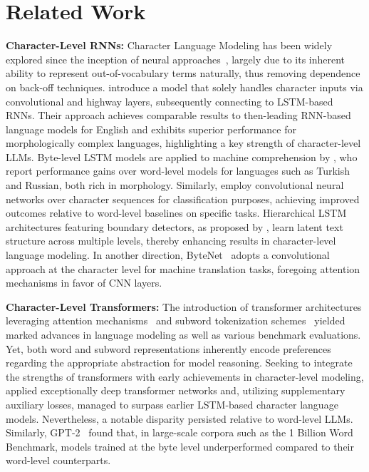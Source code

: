 \section{Related Work}
\label{section:related_work}

\textbf{Character-Level RNNs:} Character Language Modeling has been widely explored since the inception of neural approaches~\citep{sutskever2011generating,mikolov2012subword,graves2013generating}, largely due to its inherent ability to represent out-of-vocabulary terms naturally, thus removing dependence on back-off techniques. \cite{kim2016character} introduce a model that solely handles character inputs via convolutional and highway layers, subsequently connecting to LSTM-based RNNs. Their approach achieves comparable results to then-leading RNN-based language models for English and exhibits superior performance for morphologically complex languages, highlighting a key strength of character-level LLMs. Byte-level LSTM models are applied to machine comprehension by \cite{kenter2018byte}, who report performance gains over word-level models for languages such as Turkish and Russian, both rich in morphology. Similarly, \cite{zhang2015character} employ convolutional neural networks over character sequences for classification purposes, achieving improved outcomes relative to word-level baselines on specific tasks. Hierarchical LSTM architectures featuring boundary detectors, as proposed by \citet{chung2019hierarchical}, learn latent text structure across multiple levels, thereby enhancing results in character-level language modeling. In another direction, ByteNet~\cite{kalchbrenner2016neural} adopts a convolutional approach at the character level for machine translation tasks, foregoing attention mechanisms in favor of CNN layers.

\textbf{Character-Level Transformers:} The introduction of transformer architectures leveraging attention mechanisms~\citep{vaswani2017attention} and subword tokenization schemes~\citep{sennrich-etal-2016-neural} yielded marked advances in language modeling as well as various benchmark evaluations. Yet, both word and subword representations inherently encode preferences regarding the appropriate abstraction for model reasoning. Seeking to integrate the strengths of transformers with early achievements in character-level modeling, \citet{al2019character} applied exceptionally deep transformer networks and, utilizing supplementary auxiliary losses, managed to surpass earlier LSTM-based character language models. Nevertheless, a notable disparity persisted relative to word-level LLMs. Similarly, GPT-2~\citep{radfordgpt2} found that, in large-scale corpora such as the 1 Billion Word Benchmark, models trained at the byte level underperformed compared to their word-level counterparts.

